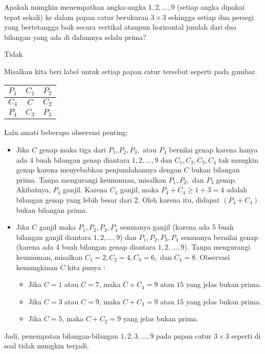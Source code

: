 \documentclass[11pt]{scrartcl}
\begin{document}
	\begin{soalbaru} 
		Apakah mungkin menempatkan angka-angka $1,2,\dots,9$ (setiap angka dipakai tepat sekali) ke dalam papan catur berukuran $3\times 3$ sehingga setiap dua persegi yang bertetangga baik secara vertikal ataupun horizontal jumlah dari dua bilangan yang ada di dalamnya selalu prima?
		\begin{jawaban}
		Tidak
		\end{jawaban}
		\begin{solusi}
		
		Misalkan kita beri label untuk setiap papan catur tersebut seperti pada gambar. 
		
		\begin{center}
				\begin{tabular}{|c|c|c|}
				\hline
				$P_1$ & $C_1$ & $P_2$ \\
				\hline
				$C_4$ & $C$   &  $C_2$\\
				\hline
				$P_4$ & $C_3$ & $P_3$\\
				\hline
				\end{tabular}
				\end{center}
		Lalu amati beberapa observasi penting:
		\begin{itemize}
		\item Jika $C$ genap maka tiga dari $P_1,P_2,P_3,$ atau $P_4$ bernilai genap karena hanya ada 4 buah bilangan genap diantara $1,2,\dots,9$ dan $C_1,C_2,C_3,C_4$ tak mungkin genap karena menyebabkan penjumlahannya dengan $C$ bukan bilangan prima. Tanpa mengurangi keumuman, misalkan $P_1,P_2, $ dan $P_3$ genap. Akibatnya, $P_4$ ganjil. Karena $C_4$ ganjil, maka $P_4+C_4 \ge 1 + 3 =4$ adalah bilangan genap yang lebih besar dari 2. Oleh karena itu, didapat $(P_4 +C_4)$ bukan bilangan prima.
		\item Jika $C$ ganjil maka $P_1,P_2,P_3,P_4$  semuanya ganjil (karena ada 5 buah bilangan ganjil diantara $1,2,\dots,9$) dan $P_1,P_2,P_3,P_4$ semuanya bernilai genap (karena ada 4 buah bilangan genap diantara $1,2,\dots,9$). Tanpa mengurangi keumuman, misalkan $C_1=2,C_2=4,C_3=6,$ dan $C_4=8$. Observasi kemungkinan $C$ kita punya : 
		\begin{itemize}
		\item Jika $C=1$ atau $C=7$, maka $C+C_4 =9$ atau $15$ yang jelas bukan prima.
		\item Jika $C=3$ atau $C=9$, maka $C+C_3 =9$ atau $15$ yang jelas bukan prima.
		\item Jika $C=5$, maka $C+C_2 =9$ yang jelas bukan prima.
		\end{itemize}
		\end{itemize}
		Jadi, penempatan bilangan-bilangan $1,2,3,\dots,9$ pada papan catur $3 \times 3$ seperti di soal tidak mungkin terjadi.
		\end{solusi}
	\end{soalbaru}
\end{document}
